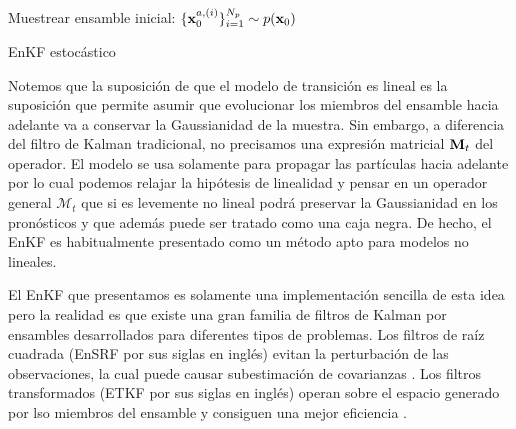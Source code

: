 \begin{algorithm}[H]\label{algo:enkf_pert_obs}
    Muestrear ensamble inicial: $\{\mathbf{x}_0^{a, (i)} \}_{i=1}^{N_p} \sim p(\mathbf{x}_0)$
    
\caption{EnKF estocástico}
\end{algorithm}

Notemos que la suposición de que el modelo de transición es lineal es la suposición que permite asumir que evolucionar los miembros del ensamble hacia adelante va a conservar la Gaussianidad de la muestra. Sin embargo, a diferencia del filtro de Kalman tradicional, no precisamos una expresión matricial $\mathbf{M}_t$ del operador. El modelo se usa solamente para propagar las partículas hacia adelante por lo cual podemos relajar la hipótesis de linealidad y pensar en un operador general $\mathcal{M}_t$ que si es levemente no lineal podrá preservar la Gaussianidad en los pronósticos y que además puede ser tratado como una caja negra. De hecho, el EnKF es habitualmente presentado como un método apto para modelos no lineales.

El EnKF que presentamos es solamente una implementación sencilla de esta idea pero la realidad es que existe una gran familia de filtros de Kalman por ensambles desarrollados para diferentes tipos de problemas. Los filtros de raíz cuadrada (EnSRF por sus siglas en inglés) evitan la perturbación de las observaciones, la cual puede causar subestimación de covarianzas \citep{Whitaker2002}. Los filtros transformados (ETKF por sus siglas en inglés) operan sobre el espacio generado por lso miembros del ensamble y consiguen una mejor eficiencia \citep{Bishop2001}.

